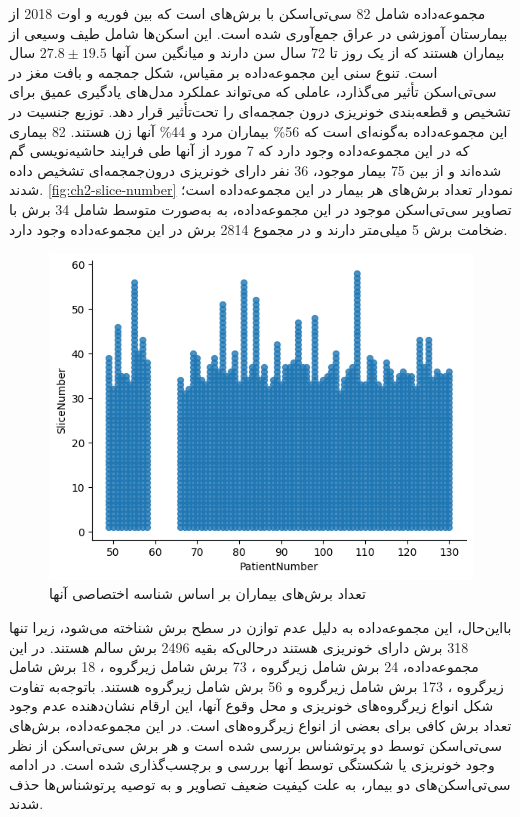 مجموعه‌داده 
 شامل 82 سی‌تی‌اسکن با برش‌‌های 
است که بین فوریه و اوت 2018 از بیمارستان آموزشی 
 در عراق جمع‌آوری شده است. این اسکن‌ها شامل طیف وسیعی از بیماران هستند که از یک روز تا 72 سال سن دارند و میانگین سن آنها 
 $27.8 \pm 19.5$
 سال است. تنوع سنی این مجموعه‌داده بر مقیاس، شکل جمجمه و بافت مغز در سی‌تی‌اسکن تأثیر می‌گذارد، عاملی که می‌تواند عملکرد مدل‌های یادگیری عمیق برای تشخیص و قطعه‌بندی خونریزی درون جمجمه‌ای را تحت‌تأثیر قرار دهد. توزیع جنسیت در این مجموعه‌داده به‌گونه‌ای است که 56\%  بیماران مرد و 44\% آنها زن هستند.
82 بیماری که در این مجموعه‌داده وجود دارد که 7 مورد از آنها طی فرایند حاشیه‌نویسی گم شده‌اند و از بین 75 بیمار موجود، 36 نفر دارای خونریزی درون‌جمجمه‌ای تشخیص داده شدند.
\autoref{fig:ch2-slice-number}
نمودار تعداد برش‌های هر بیمار در این مجموعه‌داده است؛ تصاویر سی‌تی‌اسکن موجود در این مجموعه‌داده،  به به‌صورت متوسط شامل 34 برش با ضخامت برش 5 میلی‌متر دارند و در مجموع 2814 برش در این مجموعه‌داده وجود دارد. 
\begin{figure}[h]
\centering
\includegraphics[width=1.0\linewidth]{"Images/Chapter2/Slice number"}
\caption{‌تعداد برش‌های بیماران بر اساس شناسه اختصاصی آنها}
\label{fig:ch2-slice-number}
\end{figure}

بااین‌حال، این مجموعه‌داده به دلیل عدم توازن در سطح برش شناخته می‌شود، زیرا تنها 318 برش دارای خونریزی هستند درحالی‌که  بقیه 2496 برش سالم هستند. در این مجموعه‌داده، 24 برش شامل زیرگروه
 ،
  73 برش شامل زیرگروه
 ، 
  18 برش شامل زیرگروه
 ،
173 برش شامل زیرگروه
 و 56 برش شامل زیرگروه 
هستند. باتوجه‌به تفاوت شکل انواع زیرگروه‌های خونریزی و محل وقوع آنها، این ارقام نشان‌دهنده عدم وجود تعداد برش کافی برای بعضی از انواع زیرگروه‌های است.
در این مجموعه‌داده، برش‌های سی‌تی‌اسکن توسط دو پرتوشناس بررسی شده است و هر برش سی‌تی‌اسکن از نظر وجود خونریزی یا شکستگی توسط آنها بررسی و برچسب‌گذاری شده است. در ادامه سی‌تی‌اسکن‌های دو بیمار، به علت کیفیت ضعیف تصاویر و به توصیه پرتوشناس‌ها حذف شدند\cite{kyung2022improved}.

